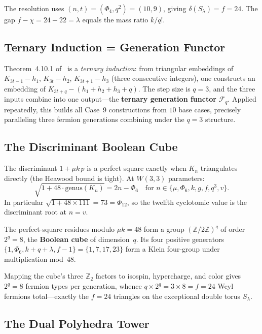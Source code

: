 The resolution uses $(n,t) = (\Phi_4, q^2) = (10, 9)$, giving $\delta(S_\lambda) = f = 24$.  The gap $f - \chi = 24 - 22 = \lambda$ equals the mass ratio $k/q!$.

\subsection{Ternary Induction = Generation Functor}

Theorem~4.10.1 of~\cite{JR1980} is a \emph{ternary induction}: from triangular embeddings of $K_{3t-1} - h_1$, $K_{3t} - h_2$, $K_{3t+1} - h_3$ (three consecutive integers), one constructs an embedding of $K_{3t+q} - (h_1 + h_2 + h_3 + q)$.  The step size is $q = 3$, and the three inputs combine into one output---the \textbf{ternary generation functor} $\mathcal{F}_q$.  Applied repeatedly, this builds all Case~9 constructions from $10$ base cases, precisely paralleling three fermion generations combining under the $q = 3$ structure.

\subsection{The Discriminant Boolean Cube}

The discriminant $1 + \mu k\,p$ is a perfect square exactly when $K_n$ triangulates directly (the Heawood bound is tight).  At $W(3,3)$ parameters:
\[
  \sqrt{1 + 48 \cdot \mathrm{genus}(K_n)} = 2n - \Phi_6 \quad\text{for } n \in \{\mu, \Phi_6, k, g, f, q^3, v\}.
\]
In particular $\sqrt{1 + 48 \times 111} = 73 = \Phi_{12}$, so the twelfth cyclotomic value is the discriminant root at $n = v$.

The perfect-square residues modulo $\mu k = 48$ form a group $(\mathbb{Z}/2\mathbb{Z})^q$ of order $2^q = 8$, the \textbf{Boolean cube} of dimension~$q$.  Its four positive generators $\{1, \Phi_6, k{+}q{+}\lambda, f{-}1\} = \{1, 7, 17, 23\}$ form a Klein four-group under multiplication mod~$48$.

Mapping the cube's three $\mathbb{Z}_2$ factors to isospin, hypercharge, and color gives $2^q = 8$ fermion types per generation, whence $q \times 2^q = 3 \times 8 = f = 24$ Weyl fermions total---exactly the $f = 24$ triangles on the exceptional double torus $S_\lambda$.

\subsection{The Dual Polyhedra Tower}

